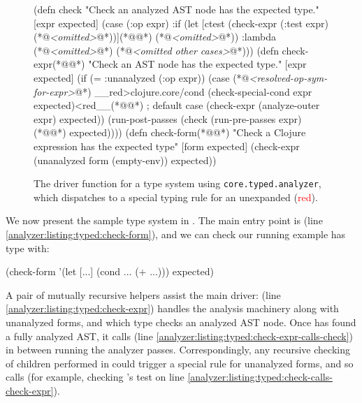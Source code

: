 \begin{figure}
  \lstset{numbers=left}
\begin{cljlisting}
(defn check
  "Check an analyzed AST node has the expected type."
  [expr expected]
  (case (:op expr)
    :if (let [ctest (check-expr (:test expr) (*@\emph{<omitted>}@*))](*@\label{analyzer:listing:typed:check-calls-check-expr}@*)
          (*@\emph{<omitted>}@*))
    :lambda (*@\emph{<omitted>}@*)
    (*@\emph{<omitted other cases>}@*)))
(defn check-expr(*@\label{analyzer:listing:typed:check-expr}@*)
  "Check an AST node has the expected type."
  [expr expected]
  (if (= :unanalyzed (:op expr))
    (case (*@\emph{<resolved-op-sym-for-expr>}@*)
      __red>clojure.core/cond (check-special-cond expr expected)<red__(*@\label{analyzer:listing:typed:check-expr:special-cond}@*)
      ; default case
      (check-expr (analyze-outer expr) expected))
    (run-post-passes
      (check (run-pre-passes expr)(*@\label{analyzer:listing:typed:check-expr-calls-check}@*)
             expected))))
(defn check-form(*@\label{analyzer:listing:typed:check-form}@*)
  "Check a Clojure expression has the expected type"
  [form expected]
  (check-expr (unanalyzed form (empty-env))
              expected))
\end{cljlisting}
  \caption{The driver function  for a type system using \texttt{core.typed.analyzer},
  which dispatches to a special typing rule for an unexpanded  (\textcolor{red}{red}).}
  \label{fig:analyzer:core.typed.analyzer-driver}
\end{figure}

We now present the sample type system in .
The main entry point is  (line \ref{analyzer:listing:typed:check-form}),
and we can check our running example has type 
with:

\begin{cljlisting}
(check-form '(let [...] (cond ... (+ ...)))
            expected)
\end{cljlisting}

A pair of mutually recursive helpers assist the main driver:  (line \ref{analyzer:listing:typed:check-expr})
handles the analysis machinery along with unanalyzed forms,
and 
which type checks an analyzed AST node.
Once  has found a fully analyzed AST, it calls
 (line \ref{analyzer:listing:typed:check-expr-calls-check})
in between running the analyzer passes.
Correspondingly, any recursive checking of children performed in 
could trigger a special rule for unanalyzed forms, and so
calls  (for example, checking 's test on
line \ref{analyzer:listing:typed:check-calls-check-expr}).


